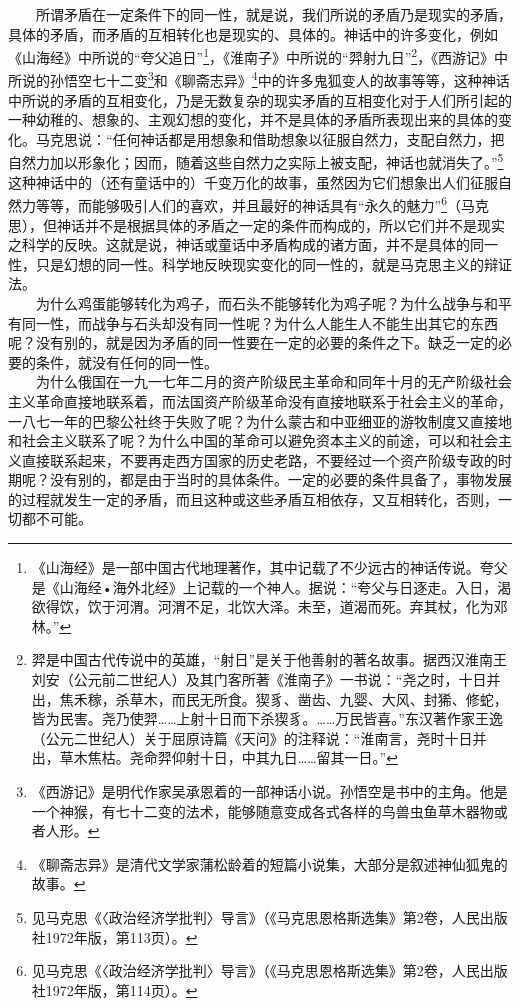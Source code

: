 \documentclass[cn,11pt,chinese]{elegantbook}
\begin{document}
　　所谓矛盾在一定条件下的同一性，就是说，我们所说的矛盾乃是现实的矛盾，具体的矛盾，而矛盾的互相转化也是现实的、具体的。神话中的许多变化，例如《山海经》中所说的“夸父追日”\footnote[27]{ 《山海经》是一部中国古代地理著作，其中记载了不少远古的神话传说。夸父是《山海经•海外北经》上记载的一个神人。据说：“夸父与日逐走。入日，渴欲得饮，饮于河渭。河渭不足，北饮大泽。未至，道渴而死。弃其杖，化为邓林。”}，《淮南子》中所说的“羿射九日”\footnote[28]{ 羿是中国古代传说中的英雄，“射日”是关于他善射的著名故事。据西汉淮南王刘安（公元前二世纪人）及其门客所著《淮南子》一书说：“尧之时，十日并出，焦禾稼，杀草木，而民无所食。猰豸、凿齿、九婴、大风、封狶、修蛇，皆为民害。尧乃使羿……上射十日而下杀猰豸。……万民皆喜。”东汉著作家王逸（公元二世纪人）关于屈原诗篇《天问》的注释说：“淮南言，尧时十日并出，草木焦枯。尧命羿仰射十日，中其九日……留其一日。”}，《西游记》中所说的孙悟空七十二变\footnote[29]{ 《西游记》是明代作家吴承恩着的一部神话小说。孙悟空是书中的主角。他是一个神猴，有七十二变的法术，能够随意变成各式各样的鸟兽虫鱼草木器物或者人形。}和《聊斋志异》\footnote[30]{ 《聊斋志异》是清代文学家蒲松龄着的短篇小说集，大部分是叙述神仙狐鬼的故事。}中的许多鬼狐变人的故事等等，这种神话中所说的矛盾的互相变化，乃是无数复杂的现实矛盾的互相变化对于人们所引起的一种幼稚的、想象的、主观幻想的变化，并不是具体的矛盾所表现出来的具体的变化。马克思说：“任何神话都是用想象和借助想象以征服自然力，支配自然力，把自然力加以形象化；因而，随着这些自然力之实际上被支配，神话也就消失了。”\footnote[31]{ 见马克思《〈政治经济学批判〉导言》（《马克思恩格斯选集》第2卷，人民出版社1972年版，第113页）。}这种神话中的（还有童话中的）千变万化的故事，虽然因为它们想象出人们征服自然力等等，而能够吸引人们的喜欢，并且最好的神话具有“永久的魅力”\footnote[32]{ 见马克思《〈政治经济学批判〉导言》（《马克思恩格斯选集》第2卷，人民出版社1972年版，第114页）。}（马克思），但神话并不是根据具体的矛盾之一定的条件而构成的，所以它们并不是现实之科学的反映。这就是说，神话或童话中矛盾构成的诸方面，并不是具体的同一性，只是幻想的同一性。科学地反映现实变化的同一性的，就是马克思主义的辩证法。\\
　　为什么鸡蛋能够转化为鸡子，而石头不能够转化为鸡子呢？为什么战争与和平有同一性，而战争与石头却没有同一性呢？为什么人能生人不能生出其它的东西呢？没有别的，就是因为矛盾的同一性要在一定的必要的条件之下。缺乏一定的必要的条件，就没有任何的同一性。\\
　　为什么俄国在一九一七年二月的资产阶级民主革命和同年十月的无产阶级社会主义革命直接地联系着，而法国资产阶级革命没有直接地联系于社会主义的革命，一八七一年的巴黎公社终于失败了呢？为什么蒙古和中亚细亚的游牧制度又直接地和社会主义联系了呢？为什么中国的革命可以避免资本主义的前途，可以和社会主义直接联系起来，不要再走西方国家的历史老路，不要经过一个资产阶级专政的时期呢？没有别的，都是由于当时的具体条件。一定的必要的条件具备了，事物发展的过程就发生一定的矛盾，而且这种或这些矛盾互相依存，又互相转化，否则，一切都不可能。\\
\end{document}
